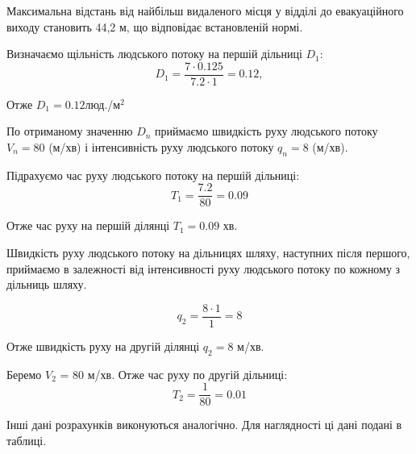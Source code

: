 \par Максимальна відстань від найбільш видаленого місця у відділі до евакуаційного виходу становить 44,2 м, що відповідає встановленій нормі.
\par Визначаємо щільність людського потоку на першій дільниці $D_{1}$:
	\begin{equation}
		D_{1}=\frac{7\cdot 0.125}{7.2\cdot 1}=0.12,
	\end{equation}

\par Отже $D_{1}=0.12$люд./м$^2$

\par По отриманому значенню $D_{n}$ приймаємо швидкість руху людського потоку $V_{n}=80$ (м/хв) і інтенсивність руху людського потоку $q_{n}=8$ (м/хв).
\par Підрахуємо час руху людського потоку на першій дільниці:
	\begin{equation}
		T_{1}=\frac{7.2}{80} = 0.09
	\end{equation}
\par Отже час руху на першій ділянці $T_{1} = 0.09$ хв.

\par Швидкість руху людського потоку на дільницях шляху, наступних після першого, приймаємо в залежності від інтенсивності руху людського потоку по кожному з дільниць шляху.

	\begin{equation}
		q_{2}=\frac{8\cdot 1}{1} = 8
	\end{equation}
\par Отже швидкість руху на другій ділянці $q_{2} = 8$ м/хв.


\par Беремо $V_{2}$ = 80 м/хв.
Отже час руху по другій дільниці:
	\begin{equation}
		T_{2}=\frac{1}{80} = 0.01
	\end{equation}

\par Інші дані розрахунків виконуються аналогічно. Для наглядності ці дані подані в таблиці.



